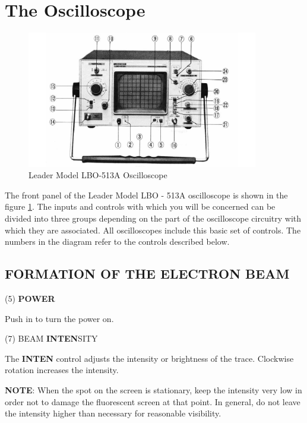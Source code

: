 \newpage
\section{The Oscilloscope}

\begin{figure}[h]
    \begin{center}
        \includegraphics[width=0.9\textwidth]{./Exp3/pic/imageosc.png}
    \end{center}
    \caption{Leader Model LBO-513A Oscilloscope}
    \label{fig:oscillofront}
\end{figure}

The front panel of the Leader Model LBO - 513A oscilloscope is shown in the figure \ref{fig:oscillofront}. The inputs and controls with which you will be concerned can be divided into three groups depending on the part of the oscilloscope circuitry with which they are associated. All oscilloscopes include this basic set of controls. The numbers in the diagram refer to the controls described below. \myskip

\subsection{FORMATION OF THE ELECTRON BEAM}

\indent \indent (5) \textbf{POWER}\myskip

\indent \indent Push in to turn the power on.\myskip

\indent (7) BEAM \textbf{INTEN}SITY \myskip

\indent \indent The \textbf{INTEN} control adjusts the intensity or brightness of the trace. Clockwise rotation increases the intensity. \myskip

\indent \textbf{NOTE}: When the spot on the screen is stationary, keep the intensity very low in order not to damage the fluorescent screen at that point. In general, do not leave the intensity higher than necessary for reasonable visibility. \myskip

